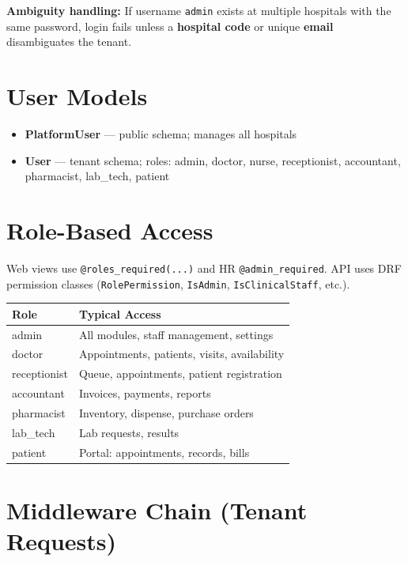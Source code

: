 \documentclass[11pt,a4paper]{report}
\begin{document}
\textbf{Ambiguity handling:} If username \texttt{admin} exists at multiple hospitals with the same password, login fails unless a \textbf{hospital code} or unique \textbf{email} disambiguates the tenant.

\section{User Models}

\begin{itemize}[noitemsep]
    \item \textbf{PlatformUser} --- public schema; manages all hospitals
    \item \textbf{User} --- tenant schema; roles: admin, doctor, nurse, receptionist, accountant, pharmacist, lab\_tech, patient
\end{itemize}

\section{Role-Based Access}

Web views use \texttt{@roles\_required(...)} and HR \texttt{@admin\_required}. API uses DRF permission classes (\texttt{RolePermission}, \texttt{IsAdmin}, \texttt{IsClinicalStaff}, etc.).

\begin{table}[h]
\centering
\small
\begin{tabular}{@{}ll@{}}
\toprule
\textbf{Role} & \textbf{Typical Access} \\
\midrule
admin & All modules, staff management, settings \\
doctor & Appointments, patients, visits, availability \\
receptionist & Queue, appointments, patient registration \\
accountant & Invoices, payments, reports \\
pharmacist & Inventory, dispense, purchase orders \\
lab\_tech & Lab requests, results \\
patient & Portal: appointments, records, bills \\
\bottomrule
\end{tabular}
\end{table}

\section{Middleware Chain (Tenant Requests)}
\end{document}
